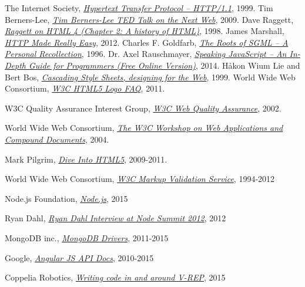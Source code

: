 \renewcommand{\bibname}{References}
\begin{thebibliography}{99}

  The Internet Society,
  \emph{\href{http://tools.ietf.org/html/rfc2616}{Hypertext Transfer Protocol -- HTTP/1.1}},  
  1999.
  Tim Berners-Lee,
  \emph{\href{http://www.ted.com/talks/tim_berners_lee_on_the_next_web?language=en}{Tim Berners-Lee TED Talk on the Next Web}},  
  2009.
  Dave Raggett,
  \emph{\href{http://www.w3.org/People/Raggett/book4/ch02.html}{Raggett on HTML 4 (Chapter 2: A history of HTML)}},  
  1998.
  James Marshall,
  \emph{\href{http://www.jmarshall.com/easy/http/}{HTTP Made Really Easy}},  
  2012.
Charles F. Goldfarb,
\emph{\href{http://www.sgmlsource.com/history/roots.htm}{The Roots of SGML -- A Personal Recollection}},  
1996.
Dr. Axel Rauschmayer,
\emph{\href{http://speakingjs.com/es5/}{Speaking JavaScript -- An In-Depth Guide for Programmers (Free Online Version)}},  
2014.
Håkon Wium Lie and Bert Bos,
\emph{\href{http://www.w3.org/Style/LieBos2e/history/Overview.html}{Cascading Style Sheets, designing for the Web}},  
1999.
World Wide Web Consortium,
\emph{\href{http://www.w3.org/html/logo/faq.html}{W3C HTML5 Logo FAQ}},  
2011.

W3C Quality Assurance Interest Group,
\emph{\href{http://www.w3.org/QA/2002/04/Web-Quality}{W3C Web Quality Assurance}},  
2002.

World Wide Web Consortium,
\emph{\href{http://www.w3.org/2004/04/webapps-cdf-ws/}{The W3C Workshop on Web Applications and Compound Documents}},  
2004.

Mark Pilgrim,
\emph{\href{http://diveintohtml5.info/index.html}{Dive Into HTML5}},  
2009-2011.

World Wide Web Consortium,
\emph{\href{https://validator.w3.org/}{W3C Markup Validation Service}},  
1994-2012

Node.js Foundation,
\emph{\href{https://nodejs.org/}{Node.js}},  
2015

Ryan Dahl,
\emph{\href{https://youtu.be/Fc26auhSLqM?t=1m32s}{Ryan Dahl Interview at Node Summit 2012}},  
2012

MongoDB inc.,
\emph{\href{http://docs.mongodb.org/ecosystem/drivers/}{MongoDB Drivers}},  
2011-2015

Google,
\emph{\href{https://docs.angularjs.org/api?PHPSESSID=cae8e98e7ca559b4605d75c813b358ee}{Angular JS API Docs}},  
2010-2015

Coppelia Robotics,
\emph{\href{http://www.coppeliarobotics.com/helpFiles/en/writingCode.htm}{Writing code in and around V-REP}},  
2015


\end{thebibliography}